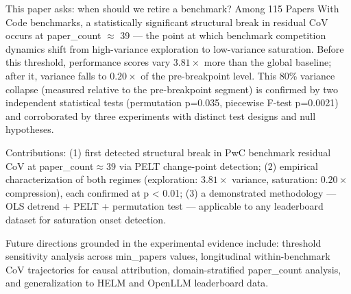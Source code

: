 
This paper asks: when should we retire a benchmark? Among 115 Papers With Code benchmarks, a statistically significant structural break in residual CoV occurs at paper\_count\* $\approx$ 39 --- the point at which benchmark competition dynamics shift from high-variance exploration to low-variance saturation. Before this threshold, performance scores vary 3.$81\times$ more than the global baseline; after it, variance falls to 0.$20\times$ of the pre-breakpoint level. This 80\% variance collapse (measured relative to the pre-breakpoint segment) is confirmed by two independent statistical tests (permutation p=0.035, piecewise F-test p=0.0021) and corroborated by three experiments with distinct test designs and null hypotheses.

Contributions: (1) first detected structural break in PwC benchmark residual CoV at paper\_count\*$\approx 39$ via PELT change-point detection; (2) empirical characterization of both regimes (exploration: 3.$81\times$ variance, saturation: 0.$20\times$ compression), each confirmed at p < 0.01; (3) a demonstrated methodology --- OLS detrend + PELT + permutation test --- applicable to any leaderboard dataset for saturation onset detection.

Future directions grounded in the experimental evidence include: threshold sensitivity analysis across min\_papers values, longitudinal within-benchmark CoV trajectories for causal attribution, domain-stratified paper\_count\* analysis, and generalization to HELM and OpenLLM leaderboard data.

